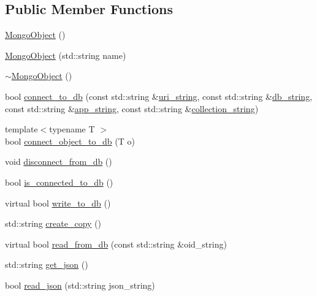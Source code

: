 \subsection*{Public Member Functions}
\begin{DoxyCompactItemize}
\item 
\hyperlink{class_mongo_object_ae0438efeae33db2bfeb3972e1196a8a9}{Mongo\+Object} ()
\item 
\hyperlink{class_mongo_object_a9e876f9d6e7cfcb7d4ce9046014e2b5f}{Mongo\+Object} (std\+::string name)
\item 
\hyperlink{class_mongo_object_ac1aba6b5189bca3feb08a698a01c1c30}{$\sim$\+Mongo\+Object} ()
\item 
bool \hyperlink{class_mongo_object_a7ef98cecb5c625a9c3e9a57373be41b8}{connect\+\_\+to\+\_\+db} (const std\+::string \&\hyperlink{class_mongo_object_a71e3fa5196ad3b496d0aa326d61e84e8}{uri\+\_\+string}, const std\+::string \&\hyperlink{class_mongo_object_a215dc4379af5ac81e19d245f5d5d37e0}{db\+\_\+string}, const std\+::string \&\hyperlink{class_mongo_object_ace5148b45dd674c73077a044d0233ed8}{app\+\_\+string}, const std\+::string \&\hyperlink{class_mongo_object_a59d2d926fd2f8048b1dab88b3e1fea5b}{collection\+\_\+string})
\item 
{\footnotesize template$<$typename T $>$ }\\bool \hyperlink{class_mongo_object_adbb80b6af3e780c81cc455f480507749}{connect\+\_\+object\+\_\+to\+\_\+db} (T o)
\item 
void \hyperlink{class_mongo_object_ae541414f753a8fd792cf0be163117b99}{disconnect\+\_\+from\+\_\+db} ()
\item 
bool \hyperlink{class_mongo_object_ae67113e87e4dadcd51c23aa373eba61d}{is\+\_\+connected\+\_\+to\+\_\+db} ()
\item 
virtual bool \hyperlink{class_mongo_object_a65971bad07dce8b649820f9dee5d0ae8}{write\+\_\+to\+\_\+db} ()
\item 
std\+::string \hyperlink{class_mongo_object_ad5165ed92020fba7d502a3556794ab4f}{create\+\_\+copy} ()
\item 
virtual bool \hyperlink{class_mongo_object_a729412e226c9964e13ba80688c3f5e00}{read\+\_\+from\+\_\+db} (const std\+::string \&oid\+\_\+string)
\item 
std\+::string \hyperlink{class_mongo_object_acde33629416d7f926737237264ac6ca1}{get\+\_\+json} ()
\item 
bool \hyperlink{class_mongo_object_adce8ffc4811a9d1c94701711f574bc34}{read\+\_\+json} (std\+::string json\+\_\+string)
\item 

\end{DoxyCompactItemize}
